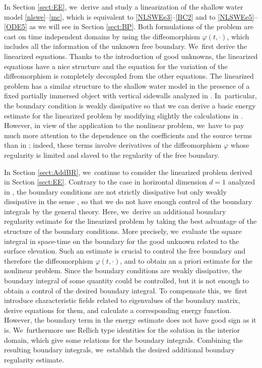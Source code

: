 \documentclass[10pt]{amsart}
\theoremstyle{definition}
\begin{document}
In Section \ref{sect:EE}, we~derive and study a linearization of the shallow water model \eqref{nlswe}--\eqref{mc}, which is equivalent to
\eqref{NLSWEe3}--\eqref{BC2} and to \eqref{NLSWEe5}--\eqref{ODE5} as we will see in Section \ref{sect:BP}.
Both formulations of the problem are cast on time independent domains by using the diffeomorphism $\varphi(t,\cdot)$,
which includes all the information of the unknown free boundary. We~first derive the linearized equations.
Thanks to the introduction of good unknowns, the linearized equations have a nice structure and the equation for the variation of the diffeomorphism is completely
decoupled from the other equations.
The linearized problem has a similar structure to the shallow water model in the presence of a fixed partially immersed object with vertical sidewalls
analyzed in \cite{IguchiLannes2023}. In~particular, the boundary condition is weakly dissipative so that
we can derive a basic energy estimate for the linearized problem by modifying slightly the calculations in \cite{IguchiLannes2023}.
However, in view of the application to the nonlinear problem, we~have to pay much more attention to the dependence on the coefficients and the source terms
than in \cite{IguchiLannes2023};
indeed, these terms involve derivatives of the diffeomorphism $\varphi$ whose regularity is limited and slaved to the regularity of the free boundary.

In Section \ref{sect:AddBR}, we~continue to consider the linearized problem derived in Section \ref{sect:EE}.
Contrary to the case in horizontal dimension $d=1$ analyzed in \cite{IguchiLannes2021},
the boundary conditions are not strictly dissipative but only weakly dissipative in the sense \cite{IguchiLannes2023},
so that we do not have enough control of the boundary integrals by the general theory.
Here, we~derive an additional boundary regularity estimate for the linearized problem by taking the best advantage of the structure of the boundary conditions.
More precisely, we~evaluate the square integral in space-time on the boundary for the good unknown related to the surface elevation.
Such an estimate is crucial to control the free boundary and therefore the diffeomorphism $\varphi(t,\cdot)$,
and to obtain an a priori estimate for the nonlinear problem.
Since the boundary conditions are weakly dissipative, the boundary integral of some quantity could be controlled,
but it is not enough to obtain a control of the desired boundary integral.
To compensate this, we~first introduce characteristic fields related to eigenvalues of the boundary matrix,
derive equations for them, and calculate a corresponding energy function.
However, the boundary term in the energy estimate does not have good sign as it is. We~furthermore use Rellich type identities for the solution in the interior domain, which give some relations for the boundary integrals.
Combining the resulting boundary integrals, we~establish the desired additional boundary regularity estimate.
\end{document}
